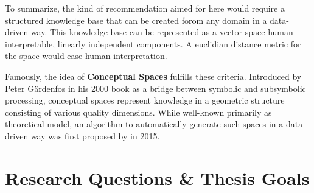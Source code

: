 To summarize, the kind of recommendation aimed for here would require a structured knowledge base that can be created forom any domain in a data-driven way. This knowledge base can be represented as a vector space human-interpretable, linearly independent components. A euclidian distance metric for the space would ease human interpretation. 

Famously, the idea of \textbf{Conceptual Spaces} fulfills these criteria. Introduced by Peter Gärdenfos in his 2000 book  \cite{Gardenfors2000a} as a bridge between symbolic and subsymbolic processing, conceptual spaces represent knowledge in a geometric structure consisting of various quality dimensions. While well-known primarily as theoretical model, an algorithm to automatically generate such spaces in a data-driven way was first proposed by  in 2015.







\section{Research Questions \& Thesis Goals}
\label{sec:goals_research_questions}

